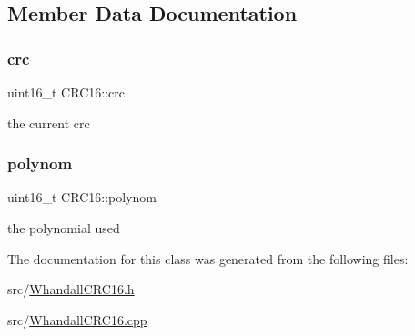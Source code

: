 \subsection{Member Data Documentation}
\mbox{\label{class_c_r_c16_aae22e2b7c6b2b96d76bd04ab28caf6d4}} 
\subsubsection{\texorpdfstring{crc}{crc}}
{\footnotesize\ttfamily uint16\+\_\+t C\+R\+C16\+::crc\hspace{0.3cm}{\ttfamily [private]}}



the current crc 

\mbox{\label{class_c_r_c16_a9a397960cbe3073502859d6a8e14e71e}} 
\subsubsection{\texorpdfstring{polynom}{polynom}}
{\footnotesize\ttfamily uint16\+\_\+t C\+R\+C16\+::polynom\hspace{0.3cm}{\ttfamily [private]}}



the polynomial used 



The documentation for this class was generated from the following files\+:\begin{DoxyCompactItemize}
\item 
src/\hyperlink{_whandall_c_r_c16_8h}{Whandall\+C\+R\+C16.\+h}\item 
src/\hyperlink{_whandall_c_r_c16_8cpp}{Whandall\+C\+R\+C16.\+cpp}\end{DoxyCompactItemize}
